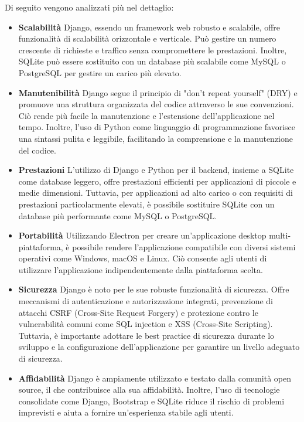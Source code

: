 Di seguito vengono analizzati più nel dettaglio:
\begin{itemize}
    \item \textbf{Scalabilità}
    Django, essendo un framework web robusto e scalabile, offre funzionalità di scalabilità 
    orizzontale e verticale. Può gestire un numero crescente di richieste e traffico senza 
    compromettere le prestazioni. Inoltre, SQLite può essere sostituito con un database più 
    scalabile come MySQL o PostgreSQL per gestire un carico più elevato.

    \item \textbf{Manutenibilità}
    Django segue il principio di "don't repeat yourself" (DRY) e promuove una struttura organizzata 
    del codice attraverso le sue convenzioni. Ciò rende più facile la manutenzione e l'estensione 
    dell'applicazione nel tempo. Inoltre, l'uso di Python come linguaggio di programmazione favorisce 
    una sintassi pulita e leggibile, facilitando la comprensione e la manutenzione del codice.

    \item \textbf{Prestazioni}
    L'utilizzo di Django e Python per il backend, insieme a SQLite come database leggero, offre prestazioni 
    efficienti per applicazioni di piccole e medie dimensioni. Tuttavia, per applicazioni ad alto carico o con 
    requisiti di prestazioni particolarmente elevati, è possibile sostituire SQLite con un database più performante 
    come MySQL o PostgreSQL.

    \item \textbf{Portabilità}
    Utilizzando Electron per creare un'applicazione desktop multi-piattaforma, è possibile rendere l'applicazione 
    compatibile con diversi sistemi operativi come Windows, macOS e Linux. Ciò consente agli utenti di utilizzare 
    l'applicazione indipendentemente dalla piattaforma scelta.

    \item \textbf{Sicurezza} 
    Django è noto per le sue robuste funzionalità di sicurezza. Offre meccanismi di autenticazione e autorizzazione integrati, 
    prevenzione di attacchi CSRF (Cross-Site Request Forgery) e protezione contro le vulnerabilità comuni come SQL 
    injection e XSS (Cross-Site Scripting). Tuttavia, è importante adottare le best practice di sicurezza durante lo sviluppo 
    e la configurazione dell'applicazione per garantire un livello adeguato di sicurezza.

    \item \textbf{Affidabilità}
    Django è ampiamente utilizzato e testato dalla comunità open source, il che contribuisce alla sua affidabilità. 
    Inoltre, l'uso di tecnologie consolidate come Django, Bootstrap e SQLite riduce il rischio di problemi imprevisti 
    e aiuta a fornire un'esperienza stabile agli utenti.

\end{itemize}

